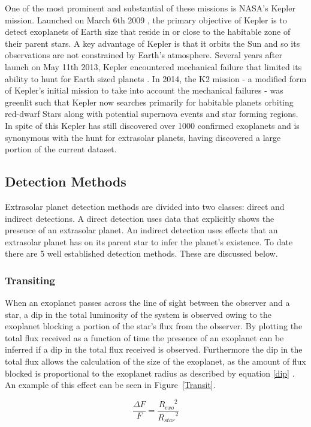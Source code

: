 \documentclass{report}
\begin{document}
One of the most prominent and substantial of these missions is NASA's Kepler mission. Launched on March 6th 2009 \parencite{nasakepler}, the primary objective of Kepler is to detect exoplanets of Earth size that reside in or close to the habitable zone of their parent stars. A key advantage of Kepler is that it orbits the Sun and so its observations are not constrained by Earth's atmosphere.  Several years after launch on May 11th 2013, Kepler encountered mechanical failure that limited its ability to hunt for Earth sized planets \parencite{keplerfailure}. In 2014, the K2 mission - a modified form of Kepler's initial mission to take into account the mechanical failures - was greenlit such that Kepler now searches primarily for habitable planets orbiting red-dwarf Stars along with potential supernova events and star forming regions. In spite of this Kepler has still discovered over 1000 confirmed exoplanets and is synonymous with the hunt for extrasolar planets, having discovered a large portion of the current dataset.

\subsection{Detection Methods}
Extrasolar planet detection methods are divided into two classes: direct and indirect detections. A direct detection uses data that explicitly shows the presence of an extrasolar planet. An indirect detection uses effects that an extrasolar planet has on its parent star to infer the planet's existence. To date there are 5 well established detection methods. These are discussed below.  

\subsubsection{Transiting}
When an exoplanet passes across the line of sight between the observer and a star, a dip in the total luminosity of the system is observed owing to the exoplanet blocking a portion of the star's flux from the observer. By plotting the total flux received as a function of time the presence of an exoplanet can be inferred if a dip in the total flux received is observed. Furthermore the dip in the total flux allows the calculation of the size of the exoplanet, as the amount of flux blocked is proportional to the exoplanet radius as described by equation \ref{dip} \parencite{radius}. An example of this effect can be seen in Figure~\ref{Transit}.

\begin{equation} \label{dip}
    \frac{\Delta F}{F} = \frac{{R_{exo}}^{2}}{{R_{star}}^{2}}
\end{equation}
\end{document}
